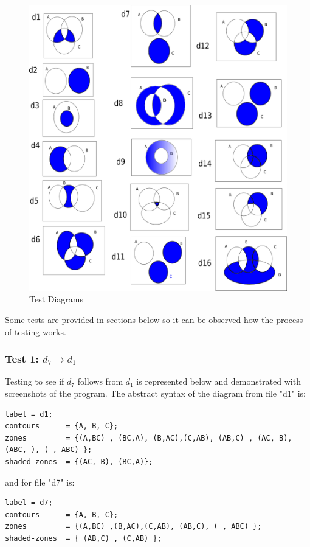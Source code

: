 \documentclass[10pt, a4paper, titlepage]{article}
\begin{document}
\begin{figure}[]
\centering
\includegraphics[scale=0.5]{images/allDiagrams.png}
\caption{Test Diagrams}
\label{fig:testDiagrams}
\end{figure}

Some tests are provided in sections below so it can be observed how the process of testing works.

\subsubsection{Test 1: $ d_{7} \rightarrow  d_{1} $}
Testing to see if $ d_{7} $ follows from $ d_{1} $ is represented below and demonstrated with screenshots of the program. The abstract syntax of the diagram from file "d1" is:
\small
\begin{lstlisting}
label = d1;
contours      = {A, B, C};
zones		  = {(A,BC) , (BC,A), (B,AC),(C,AB), (AB,C) , (AC, B), (ABC, ), ( , ABC) };
shaded-zones  = {(AC, B), (BC,A)};					
\end{lstlisting}
\large

and for file "d7" is:

\small
\begin{lstlisting}
label = d7;
contours      = {A, B, C};
zones		  = {(A,BC) ,(B,AC),(C,AB), (AB,C), ( , ABC) };
shaded-zones  = { (AB,C) , (C,AB) };					
\end{lstlisting}
\large
\end{document}
